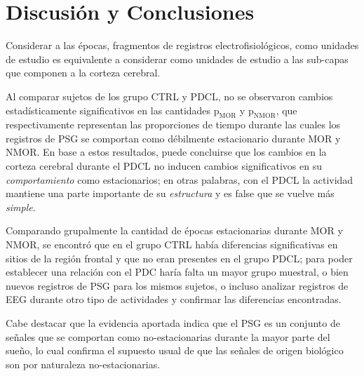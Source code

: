 \documentclass[12pt,letterpaper,draft]{book}
\begin{document}

\chapter{Discusión y Conclusiones}

Considerar a las épocas, fragmentos de registros electrofisiológicos, como unidades de estudio es equivalente a considerar como unidades de estudio a las sub-capas que componen a la corteza cerebral.

Al comparar sujetos de los grupo CTRL y PDCL, no se observaron cambios estadísticamente significativos en las cantidades $\text{p}_{\text{MOR}}$ y $\text{p}_{\text{NMOR}}$, que respectivamente representan las proporciones de tiempo durante las cuales los registros de PSG se comportan como débilmente estacionario durante MOR y NMOR. 
%
En base a estos resultados, puede concluirse que los cambios en la corteza cerebral durante el PDCL no inducen cambios significativos en su \textit{comportamiento} como estacionarios;
en otras palabras, con el PDCL la actividad mantiene una parte importante de su \textit{estructura} y es false que se vuelve más \textit{simple}.

Comparando grupalmente la cantidad de épocas estacionarias durante MOR y NMOR, se encontró que en 
el grupo CTRL había diferencias significativas en sitios de la región frontal y que no eran presentes
en el grupo PDCL; para poder establecer una relación con el PDC haría falta un mayor grupo muestral, 
o bien nuevos registros de PSG para los mismos sujetos, o incluso analizar registros de EEG durante 
otro tipo de actividades y confirmar las diferencias encontradas.

Cabe destacar que la evidencia aportada indica que el PSG es un conjunto de señales que se comportan
como no-estacionarias durante la mayor parte del sueño, lo cual confirma el supuesto usual de que 
las señales de origen biológico son por naturaleza no-estacionarias. 

\end{document}
